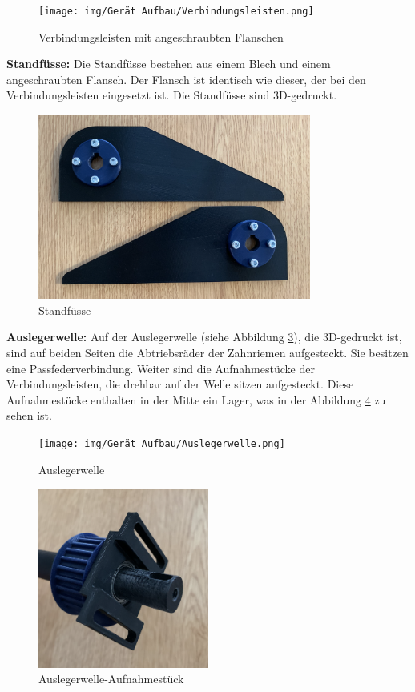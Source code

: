 \begin{figure}[H]
  \texttt{[image: img/Gerät Aufbau/Verbindungsleisten.png]}
  \centering
  \caption{Verbindungsleisten mit angeschraubten Flanschen}
  \label{fig:Verbindungsleisten}
\end{figure}

\textbf{Standfüsse:} Die Standfüsse bestehen aus einem Blech und einem angeschraubten Flansch. Der Flansch ist identisch wie dieser, der bei den Verbindungsleisten eingesetzt ist. Die Standfüsse sind 3D-gedruckt.

\begin{figure}[H]
  \includegraphics[width=0.8\textwidth]{img/Gerät Aufbau/Standfüsse.png}
  \centering
  \caption{Standfüsse}
  \label{fig:Standfüsse}
\end{figure}

\newpage

\textbf{Auslegerwelle:} Auf der Auslegerwelle (siehe Abbildung \ref{fig:Auslegerwelle}), die 3D-gedruckt ist, sind auf beiden Seiten die Abtriebsräder der Zahnriemen aufgesteckt. Sie besitzen eine Passfederverbindung. Weiter sind die Aufnahmestücke der Verbindungsleisten, die drehbar auf der Welle sitzen aufgesteckt. Diese Aufnahmestücke enthalten in der Mitte ein Lager, was in der Abbildung \ref{fig:Aufnahmestück} zu sehen ist.

\begin{figure}[H]
  \texttt{[image: img/Gerät Aufbau/Auslegerwelle.png]}
  \centering
  \caption{Auslegerwelle}
  \label{fig:Auslegerwelle}
\end{figure}

\begin{figure}[H]
  \includegraphics[width=0.5\textwidth]{img/Gerät Aufbau/Aufnahmestück.png}
  \centering
  \caption{Auslegerwelle-Aufnahmestück}
  \label{fig:Aufnahmestück}
\end{figure}


